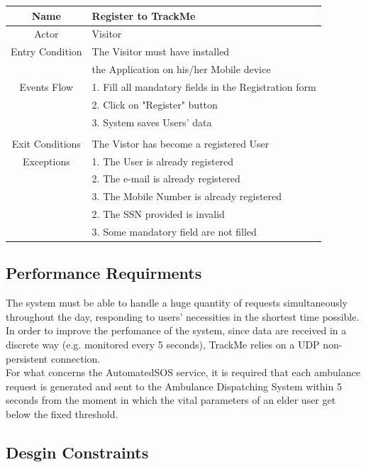 \documentclass[12pt,a4paper]{article}
\begin{document}
			\begin{center}
				\begin{tabular}{| c | l |}
					\hline
					Name & Register to TrackMe & \\ \hline
					Actor & Visitor & \\ \hline
					Entry Condition & The Visitor must have installed \\
				                &	the Application on his/her Mobile device \\ \hline
 					Events Flow  & 
 						1. Fill all mandatory fields in the Registration form\\
 						&2. Click on "Register" button\\
 						&3. System saves Users' data\\
 					  \\ \hline
					Exit Conditions  & The Vistor has become a registered User \\ \hline
					Exceptions & 
					1. The User is already registered\\
					&2. The e-mail is already registered\\
					&3. The Mobile Number is already registered\\
					&2. The SSN provided is invalid\\
					&3. Some mandatory field are not filled\\
					\hline
				\end{tabular}
			\end{center}
		
	
	\subsection{Performance Requirments}
	The system must be able to handle a huge quantity of requests simultaneously throughout the day, responding to users' necessities in the shortest time possible. In order to improve the perfomance of the system, since data are received in a discrete way (e.g. monitored every 5 seconds), TrackMe relies on a UDP non-persistent connection.\\
	For what concerns the AutomatedSOS service, it is required that each ambulance request is generated and sent to the Ambulance Dispatching System within 5 seconds from the moment in which the vital parameters of an elder user get below the fixed threshold.
	
	\subsection{Desgin Constraints}
\end{document}
